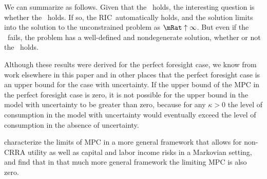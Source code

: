 \documentclass[\econtexRoot/BufferStockTheory.tex]{subfiles}
\begin{document}
\begin{comment}
We can directly compute
\begin{align}
  \nabla  & = \bRat - \bRat_{\#}^{\hat{n}}
\end{align}
and can obtain a better appxoimation to the correct $n$ from
\begin{align}
  \hat{\hat{n}} 
& = \end{align}

We can obtain a more exact approximation to the correct ${n}$ by defining
\begin{align}
\nabla(n) \equiv   \lim_{n \rightarrow \infty}\Rnorm^{n}\mathbb{C}_{t-n}^{t}-\Rnorm^{n}\mathbb{C}_{t-n}^{t}  & =  \left(\frac{\PatR^{-n}}{1-\PatR}\right).
\end{align}
from which we can obtain the difference between the approximate and the exact $\mathbb{C}_{t-n}^{t}$ as $\Rnorm^{-n}\nabla(n)$ and


For this $n$ and
$\bRat$ we can obtain the corresponding
$\cRat=\PatPGro^{-\nFunc(\bRat)}$.  Note, however, that this is {\it not}
the level of $\cRat$ directly associated with $\bRat$ on the true
consumption function, because we used only a limiting approximation to
the correct $n$ rather than the correct $n$.

Our strategy, in this case, is

The limiting difference can be obtained by realizing that
\begin{align}
\nabla(n) \equiv   \lim_{n \rightarrow \infty}\Rnorm^{n}\mathbb{C}_{t-n}^{t}-\Rnorm^{n}\mathbb{C}_{t-n}^{t}  & =  \left(\frac{\PatR^{-n}}{1-\PatR}\right).
\end{align}
and so

\end{comment}

We can summarize as follows.  Given that the \PFGIC~holds, the
interesting question is whether the \FHWC~holds.  If so, the
RIC~automatically holds, and the solution limits
into the solution to the unconstrained problem as $\mRat \uparrow
\infty$.  But even if the \FHWC~fails, the problem has a
well-defined and nondegenerate solution, whether or not the \RIC~holds.

Although these results were derived for the perfect foresight case,
we know from work elsewhere in this paper and in other places that the
perfect foresight case is an upper bound for the case with uncertainty.
If the upper bound of the MPC in the perfect foresight case is zero, it
is not possible for the upper bound in the model with uncertainty to be
greater than zero, because for any $\kappa > 0$ the level of consumption
in the model with uncertainty would eventually exceed the level of consumption
in the absence of uncertainty.

\cite{MaTodaMPC} characterize the limits of MPC in a more general framework that allows for non-CRRA utility as well as capital and labor income risks in a Markovian setting, and
find that in that much more general framework the limiting MPC is also zero.

\onlyinsubfile{}
\end{document}
